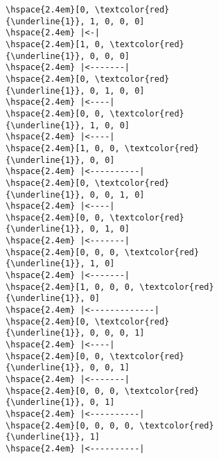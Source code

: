 \begin{figure}
    \begin{center}
	\begin{subfigure}[]{.34\textwidth}
            \begin{center}
                \begin{Verbatim}[commandchars=\\\{\}]
\hspace{2.4em}[0, \textcolor{red}{\underline{1}}, 1, 0, 0, 0]
\hspace{2.4em} |<-|
\hspace{2.4em}[1, 0, \textcolor{red}{\underline{1}}, 0, 0, 0]
\hspace{2.4em} |<-------|
\hspace{2.4em}[0, \textcolor{red}{\underline{1}}, 0, 1, 0, 0]
\hspace{2.4em} |<----|
\hspace{2.4em}[0, 0, \textcolor{red}{\underline{1}}, 1, 0, 0]
\hspace{2.4em} |<----|
\hspace{2.4em}[1, 0, 0, \textcolor{red}{\underline{1}}, 0, 0]
\hspace{2.4em} |<----------|
\hspace{2.4em}[0, \textcolor{red}{\underline{1}}, 0, 0, 1, 0]
\hspace{2.4em} |<----|
\hspace{2.4em}[0, 0, \textcolor{red}{\underline{1}}, 0, 1, 0]
\hspace{2.4em} |<-------|
\hspace{2.4em}[0, 0, 0, \textcolor{red}{\underline{1}}, 1, 0]
\hspace{2.4em} |<-------|
\hspace{2.4em}[1, 0, 0, 0, \textcolor{red}{\underline{1}}, 0]
\hspace{2.4em} |<-------------|
\hspace{2.4em}[0, \textcolor{red}{\underline{1}}, 0, 0, 0, 1]
\hspace{2.4em} |<----|
\hspace{2.4em}[0, 0, \textcolor{red}{\underline{1}}, 0, 0, 1]
\hspace{2.4em} |<-------|
\hspace{2.4em}[0, 0, 0, \textcolor{red}{\underline{1}}, 0, 1]
\hspace{2.4em} |<----------|
\hspace{2.4em}[0, 0, 0, 0, \textcolor{red}{\underline{1}}, 1]
\hspace{2.4em} |<----------|

\end{Verbatim}
\end{center}
\end{subfigure}
\end{center}
\end{figure}
